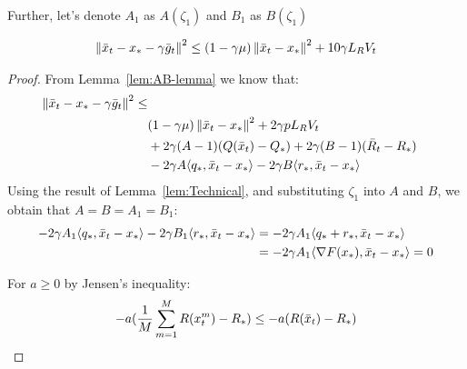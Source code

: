 Further, let's denote $A_1$ as $A(\zeta_1)$ and $B_1$ as $B(\zeta_1)$
\begin{lemma} \label{lem:main}
    \begin{align}
        \begin{split}
            \norm{\bar{x}_t - x_* - \gamma \bar{g}_t}^2 \leq (1 - \gamma \mu)\norm{\bar{x}_t - x_*}^2  + 10 \gamma L_R V_t
        \end{split}
    \end{align}
\end{lemma}
\begin{proof}
    From Lemma~\ref{lem:AB-lemma} we know that:
    \begin{align}
        \begin{split}
            \norm{\bar{x}_t - x_* - \gamma \bar{g}_t}^2 \leq \\
            &(1 - \gamma \mu)\norm{\bar{x}_t - x_*}^2 + 2 \gamma p L_R V_t \\
            &+ 2\gamma (A - 1)(Q(\bar{x}_t) - Q_*)
            + 2\gamma (B - 1)(\bar{R}_t - R_*) \\
            &- 2\gamma A \inner{q_*}{\bar{x}_t - x_*}
            - 2\gamma B \inner{r_*}{\bar{x}_t - x_*} \label{eq:main}
        \end{split}
    \end{align}
    Using the result of Lemma~\ref{lem:Technical}, and substituting $\zeta_1$ into $A$ and $B$, we obtain that $A = B = A_1 = B_1$:
    \begin{align}
        - 2\gamma A_1 \inner{q_*}{\bar{x}_t - x_*} - 2\gamma B_1 \inner{r_*}{\bar{x}_t - x_*} 
        &= - 2\gamma A_1 \inner{q_* + r_*}{\bar{x}_t - x_*} \\
        &= - 2\gamma A_1 \inner{\nabla F(x_*)}{\bar{x}_t - x_*} = 0 \label{eq:zero}
    \end{align}

    For $a \geq 0$ by Jensen's inequality:
    \begin{align}
        -a (\fsumm{m=1}{M}{R(x^m_t}) - R_*) \leq -a (R(\bar{x}_t) - R_*) \label{eq:jensen'} 
    \end{align}
    

\end{proof}
